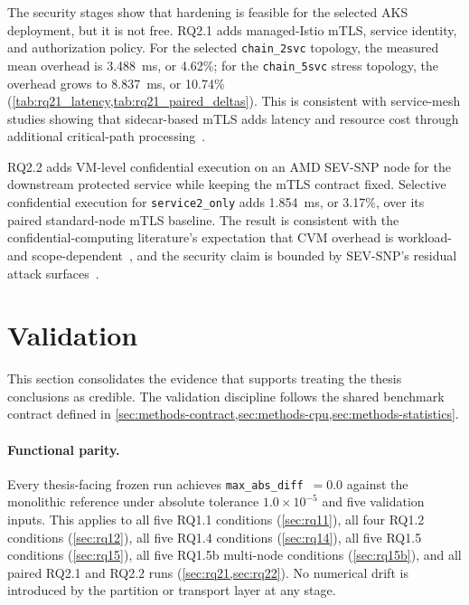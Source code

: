 The security stages show that hardening is feasible for the selected AKS
deployment, but it is not free. RQ2.1 adds managed-Istio mTLS, service
identity, and authorization policy. For the selected \texttt{chain\_2svc}
topology, the measured mean overhead is 3.488~ms, or 4.62\%; for the
\texttt{chain\_5svc} stress topology, the overhead grows to 8.837~ms, or
10.74\% (\cref{tab:rq21_latency,tab:rq21_paired_deltas}). This is consistent
with service-mesh studies showing that sidecar-based mTLS adds latency and
resource cost through additional critical-path
processing~\cite{meshinsight_socc23,bremlerbarr2025mtls}.

RQ2.2 adds VM-level confidential execution on an AMD SEV-SNP node for the
downstream protected service while keeping the mTLS contract fixed.
Selective confidential execution for \texttt{service2\_only} adds 1.854~ms,
or 3.17\%, over its paired standard-node mTLS baseline. The result is
consistent with the confidential-computing literature's expectation that
CVM overhead is workload- and
scope-dependent~\cite{yan2023_cvm_overheads,misono2024_cvm_explained,
mo2024_ml_confidential_computing}, and the security claim is bounded by
SEV-SNP's residual attack
surfaces~\cite{schluter2024_heckler}.

\section{Validation}
\label{sec:analysis-validation}

This section consolidates the evidence that supports treating the thesis
conclusions as credible. The validation discipline follows the shared
benchmark contract defined in \cref{sec:methods-contract,sec:methods-cpu,sec:methods-statistics}.

\paragraph{Functional parity.}
Every thesis-facing frozen run achieves
\texttt{max\_abs\_diff}~$=0.0$ against the monolithic reference under absolute
tolerance $1.0 \times 10^{-5}$ and five validation inputs. This applies to all
five RQ1.1 conditions (\cref{sec:rq11}), all four RQ1.2 conditions
(\cref{sec:rq12}), all five RQ1.4 conditions (\cref{sec:rq14}), all five
RQ1.5 conditions (\cref{sec:rq15}), all five RQ1.5b multi-node conditions
(\cref{sec:rq15b}), and all paired RQ2.1 and RQ2.2 runs
(\cref{sec:rq21,sec:rq22}). No numerical drift is introduced by the partition
or transport layer at any stage.


